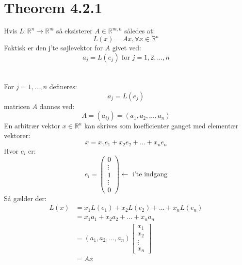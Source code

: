 \documentclass[a4paper,oneside,article]{memoir}
\begin{document}
    \section{Theorem 4.2.1}
    Hvis $L:\mathbb{R}^n\rightarrow \mathbb{R}^m$ så eksisterer $A\in \mathbb{R}^{m,n}$ således at:
    $$L(x)=Ax, \forall x \in \mathbb{R}^n$$
    Faktisk er den j'te søjlevektor for $A$ givet ved:
    $$a_j=L(e_j)\text{ for } j=1,2,\dots,n$$
    \\
    \\
    For $j=1,\dots,n$ defineres:
    $$a_j=L(e_j)$$
    matricen $A$ dannes ved:
    $$A=(a_{ij})=(a_1,a_2,\dots,a_n)$$
    En arbitrær vektor $x\in \mathbb{R}^n$ kan skrives som
    koefficienter ganget med elementær vektorer:
    $$x=x_1e_1+x_2e_2+\dots+x_ne_n$$
    Hvor $e_i$ er:
    $$e_i=\begin{pmatrix}
    0\\
    \vdots\\
    1 \\
    \vdots \\
    0
    \end{pmatrix}\leftarrow\text{ i'te indgang}$$
    Så gælder der:
    \begin{align*}
    	L(x)&=x_1L(e_1)+x_2L(e_2)+\dots+x_nL(e_n)\\
    	&=x_1a_1+x_2a_2+\dots+x_na_n\\
    	&=(a_1,a_2,\dots,a_n)\begin{bmatrix}
    	x_1\\
    	x_2\\
    	\vdots\\
    	x_n
    	\end{bmatrix}\\
    	&=Ax
    \end{align*}
    
\end{document}
